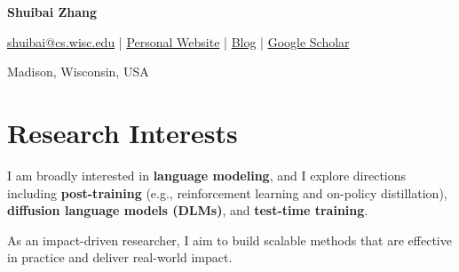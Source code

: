 \documentclass[a4paper,11pt]{article}
\newcommand{\headerfontiii}{\fontfamily{ppl}\selectfont} %
\begin{document}
\headerfontiii

\begin{center}
    {\Huge\textbf{Shuibai Zhang}}
\end{center}
\vspace{-6mm}

\begin{center}
    \small{
    \href{mailto:shuibai@cs.wisc.edu}{shuibai@cs.wisc.edu} \;|\;
    \href{https://zhangshuibai.github.io}{Personal Website} \;|\;
    \href{https://zhangshuibai.github.io/blog/}{Blog} \;|\;
    \href{https://scholar.google.com/citations?user=jkXzD7YAAAAJ&hl=en&authuser=2}{Google Scholar}
    }
\end{center}
\vspace{-4mm}

\begin{center}
    \small{Madison, Wisconsin, USA}
\end{center}

\vspace{-4mm}


\section{\textbf{Research Interests}}
\vspace{1mm}
\small{
I am broadly interested in \textbf{language modeling}, and I explore directions including \textbf{post-training} (e.g., reinforcement learning and on-policy distillation), \textbf{diffusion language models (DLMs)}, and \textbf{test-time training}. 

\vspace{0.5em}
As an impact-driven researcher, I aim to build scalable methods that are effective in practice and deliver real-world impact.
}
\vspace{-2mm}
\end{document}
